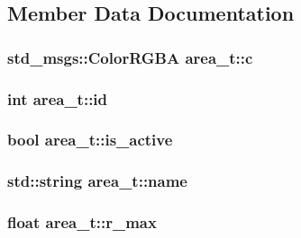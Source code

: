 \subsection{Member Data Documentation}
\subsubsection[{\texorpdfstring{c}{c}}]{\setlength{\rightskip}{0pt plus 5cm}std\+\_\+msgs\+::\+Color\+R\+G\+BA area\+\_\+t\+::c}\hypertarget{structarea__t_a2a6b84b8af35f8aa4e77237357a5a54c}{}\label{structarea__t_a2a6b84b8af35f8aa4e77237357a5a54c}
\subsubsection[{\texorpdfstring{id}{id}}]{\setlength{\rightskip}{0pt plus 5cm}int area\+\_\+t\+::id}\hypertarget{structarea__t_a5f0ca53f7fab9d65b2726310e98cad63}{}\label{structarea__t_a5f0ca53f7fab9d65b2726310e98cad63}
\subsubsection[{\texorpdfstring{is\+\_\+active}{is_active}}]{\setlength{\rightskip}{0pt plus 5cm}bool area\+\_\+t\+::is\+\_\+active}\hypertarget{structarea__t_a5b6ffeb319ff8cdf95717851bedf1204}{}\label{structarea__t_a5b6ffeb319ff8cdf95717851bedf1204}
\subsubsection[{\texorpdfstring{name}{name}}]{\setlength{\rightskip}{0pt plus 5cm}std\+::string area\+\_\+t\+::name}\hypertarget{structarea__t_a2ea22ed89ef6801defea98010f1d3446}{}\label{structarea__t_a2ea22ed89ef6801defea98010f1d3446}
\subsubsection[{\texorpdfstring{r\+\_\+max}{r_max}}]{\setlength{\rightskip}{0pt plus 5cm}float area\+\_\+t\+::r\+\_\+max}\hypertarget{structarea__t_aff46fdf51fe9f94aba74455e4a15426a}{}\label{structarea__t_aff46fdf51fe9f94aba74455e4a15426a}
